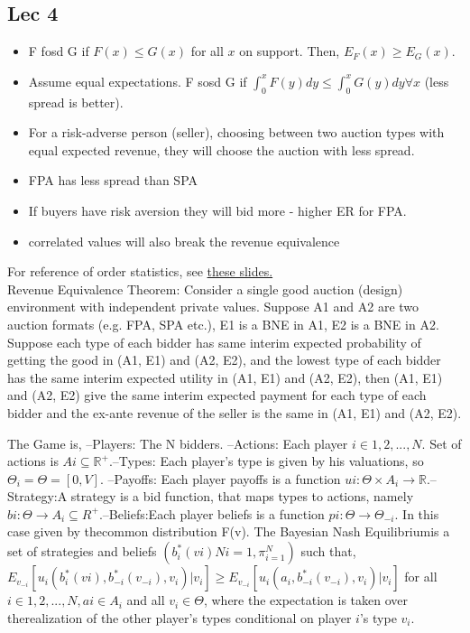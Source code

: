\documentclass[11pt]{article} %
\begin{document}
\subsection{Lec 4}
\begin{itemize}
\item F fosd G if $F(x)\leq G(x)$ for all $x$ on support. Then, $E_F(x)\geq E_G(x)$.
\item Assume equal expectations. F sosd G if $\int_{0}^{x}F(y)dy \leq \int_0^x G(y)dy \forall x$ (less spread is better).
\item For a risk-adverse person (seller), choosing between two auction types with equal expected revenue, they will choose the auction with less spread.
\item FPA has less spread than SPA
\item If buyers have risk aversion they will bid more - higher ER for FPA.
\item correlated values will also break the revenue equivalence 
\end{itemize}
For reference of order statistics, see \href{https://www2.stat.duke.edu/courses/Spring12/sta104.1/Lectures/Lec15.pdf}{these slides.} \\
Revenue Equivalence Theorem: Consider a single good auction (design) environment with independent private values. Suppose A1 and A2 are two auction formats (e.g. FPA, SPA etc.), E1 is a BNE in A1, E2 is a BNE in A2. Suppose each type of each bidder has same interim expected probability of getting the good in (A1, E1) and (A2, E2), and the lowest type of each bidder has the same interim expected utility in (A1, E1) and (A2, E2), then (A1, E1) and (A2, E2) give the same interim expected payment for each type of each bidder and the ex-ante revenue of the seller is the same in (A1, E1) and (A2, E2).

The Game is, –Players: The N bidders. –Actions: Each player $i\in{1,2,...,N}$. Set of actions is $Ai\subseteq\mathbb{R}^+$.–Types: Each player’s type is given by his valuations, so $\Theta_i = \Theta = [0,V].$ –Payoffs: Each player payoffs is a function $ui: \Theta \times A_i\rightarrow \mathbb{R}$.–Strategy:A strategy is a bid function, that maps types to actions, namely $bi: \Theta \rightarrow A_i\subseteq R^+$.–Beliefs:Each player beliefs is a function $pi: \Theta \rightarrow \Theta_{-i}$.  In this case given by thecommon distribution F(v). The Bayesian Nash Equilibriumis a set of strategies and beliefs $({b^*_i (vi)}Ni=1,{\pi}^N_{i=1})$ such that, $E_{v_{-i}}[u_i(b^*_i(vi),b^*_{-i}(v_{-i}),v_i)|v_i] \geq E_{v_{-i}}[u_i(a_i,b^*_{-i}(v_{-i}),v_i)|v_i]$ for all $i\in {1,2,...,N},ai\in A_i $ and all $v_i\in\Theta$, where the expectation is taken over therealization of the other player’s types conditional on player $i$'s type $v_i$.
\end{document}
